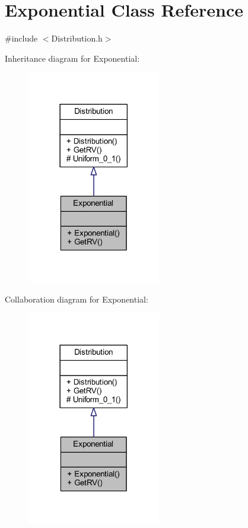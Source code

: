 \hypertarget{class_exponential}{}\section{Exponential Class Reference}
\label{class_exponential}


{\ttfamily \#include $<$Distribution.\+h$>$}



Inheritance diagram for Exponential\+:
\nopagebreak
\begin{figure}[H]
\begin{center}
\leavevmode
\includegraphics[width=165pt]{class_exponential__inherit__graph}
\end{center}
\end{figure}


Collaboration diagram for Exponential\+:
\nopagebreak
\begin{figure}[H]
\begin{center}
\leavevmode
\includegraphics[width=165pt]{class_exponential__coll__graph}
\end{center}
\end{figure}
